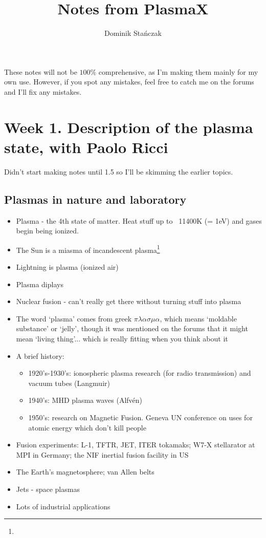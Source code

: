 
\usepackage[utf8]{inputenc}
\usepackage{graphicx}
\title{Notes from PlasmaX}
\author{Dominik Stańczak}


\maketitle

These notes will not be $100\%$ comprehensive, as I'm making them mainly for my own use. However, if you spot any mistakes, feel free to catch me on the forums and I'll fix any mistakes. 

\section{Week 1. Description of the plasma state, with Paolo Ricci}
Didn't start making notes until 1.5 so I'll be skimming the earlier topics.
	\subsection{Plasmas in nature and laboratory}
		\begin{itemize}
			\item Plasma - the 4th state of matter. Heat stuff up to ~11400K (= 1eV) and gases begin being ionized.
			\item The Sun is a miasma of incandescent plasma\footnote{}
			\item Lightning is plasma (ionized air)
			\item Plasma diplays
			\item Nuclear fusion - can't really get there without turning stuff into plasma
	\item The word `plasma' comes from greek $\pi\lambda\alpha\sigma\mu\alpha$, which means `moldable substance' or `jelly', though it was mentioned on the forums that it might mean `living thing'... which is really fitting when you think about it
			\item A brief history:
				\begin{itemize}
					\item 1920's-1930's: ionospheric plasma research (for radio transmission) and vacuum tubes (Langmuir)
					\item 1940's: MHD plasma waves (Alfvén)
					\item 1950's: research on Magnetic Fusion. Geneva UN conference on uses for atomic energy which don't kill people
				\end{itemize}
			\item Fusion experiments: L-1, TFTR, JET, ITER tokamaks; W7-X stellarator at MPI in Germany; the NIF inertial fusion facility in US
			\item The Earth's magnetosphere; van Allen belts
			\item Jets - space plasmas
			\item Lots of industrial applications
		\end{itemize}
		
